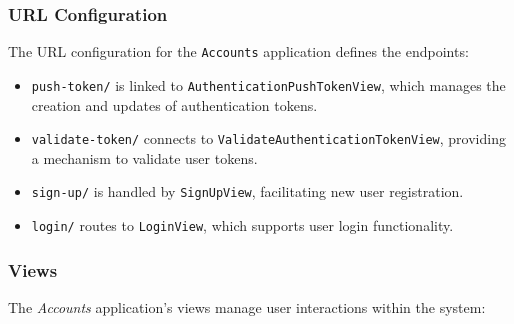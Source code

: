 \subsubsection{URL Configuration}

The URL configuration for the \texttt{Accounts} application defines the endpoints:

\begin{itemize}
    \item \texttt{push-token/} is linked to \texttt{AuthenticationPushTokenView}, which manages the creation and updates of authentication tokens.
    \item \texttt{validate-token/} connects to \texttt{ValidateAuthenticationTokenView}, providing a mechanism to validate user tokens.
    \item \texttt{sign-up/} is handled by \texttt{SignUpView}, facilitating new user registration.
    \item \texttt{login/} routes to \texttt{LoginView}, which supports user login functionality.
\end{itemize}

\subsubsection{Views}

The \textit{Accounts} application's views manage user interactions within the system:


